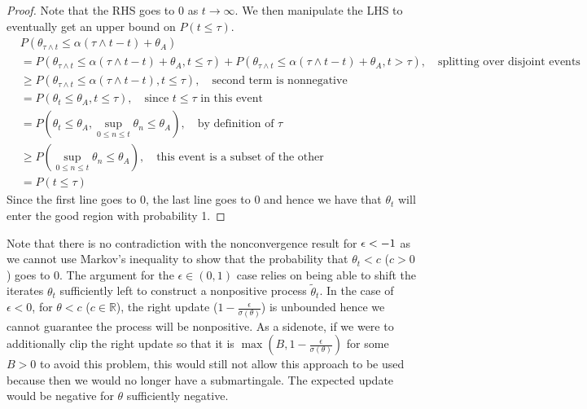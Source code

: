 \begin{proof}
Note that the RHS goes to 0 as $t \xrightarrow{} \infty$.
We then manipulate the LHS to eventually get an upper bound on $P(t \le \tau)$.
\begin{align*}
    & P(\theta_{\tau \land t}  \le \alpha (\tau \land t - t) + \theta_A) \\
    &=  P(\theta_{\tau \land t}  \le \alpha (\tau \land t - t) + \theta_A, t \le \tau) +  P(\theta_{\tau \land t}  \le \alpha (\tau \land t - t) + \theta_A, t > \tau), \quad  \text{splitting over disjoint events} \\
    &\ge  P(\theta_{\tau \land t}  \le \alpha (\tau \land t - t), t \le \tau),  \quad \text{second term is nonnegative} \\
    &=  P(\theta_t  \le  \theta_A, t \le \tau), \quad \text{since $t \le \tau$ in this event} \\
    &= P(\theta_t  \le  \theta_A, \sup_{0\le n \le t} \theta_n \le \theta_A), \quad \text{by definition of $\tau$} \\
    &\ge P(\sup_{0\le n \le t} \theta_n \le \theta_A), \quad \text{this event is a subset of the other }  \\
    &= P(t \le \tau) 
\end{align*}
Since the first line goes to $0$, the last line goes to $0$ and hence we have that $\theta_t$ will enter the good region with probability 1.

\end{proof}

Note that there is no contradiction with the nonconvergence result for ${\epsilon} < -1$ as we cannot use Markov's inequality to show that the probability that $\theta_t < c$ ($c > 0$) goes to 0. The argument for the $\epsilon \in (0,1) $ case relies on being able to shift the iterates $\theta_t$ sufficiently left to construct a nonpositive process $\tilde{\theta}_t $. In the case of $\epsilon < 0$, for $\theta < c$ ($c \in \mathbb{R}$), the right update ($1 - \frac{\epsilon}{\sigma(\theta)}$) is unbounded hence we cannot guarantee the process will be nonpositive.
As a sidenote, if we were to additionally clip the right update so that it is $\max(B, 1-\frac{\epsilon}{\sigma(\theta)})$ for some $B>0$ to avoid this problem, this would still not allow this approach to be used because then we would no longer have a submartingale. The expected update would be negative for $\theta$ sufficiently negative. 



